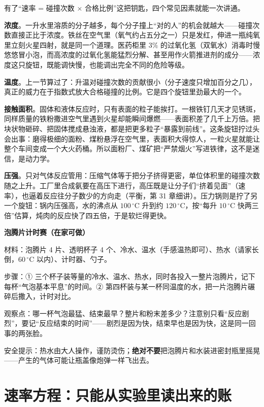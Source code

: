 有了“速率 = 碰撞次数 × 合格比例”这把钥匙，四个常见因素就能一次讲通。

\textbf{浓度}。一升水里溶质的分子越多，每个分子撞上“对的人”的机会就越大——碰撞次数直接正比于浓度。铁丝在空气里（氧气约占五分之一）只是发红，伸进一瓶纯氧里立刻火星四射，就是同一个道理。医药柜里 $3\%$ 的过氧化氢（双氧水）消毒时慢悠悠冒小泡，而高浓度的过氧化氢能猛烈分解、甚至用作火箭推进剂的成分——浓度这只旋钮，既能调快慢，也能调出完全不同的危险等级。

\textbf{温度}。上一节算过了：升温对碰撞次数的贡献很小（分子速度只增加百分之几），真正的威力在于指数式放大合格碰撞的比例。它是四个旋钮里劲最大的一个。

\textbf{接触面积}。固体和液体反应时，只有表面的粒子能挨打。一根铁钉几天才见锈斑，同样质量的铁粉撒进空气里遇到火星却能瞬间爆燃——表面积差了几千上万倍。把块状物砸碎、把固体搅成悬浊液，都是把更多粒子“暴露到前线”。这条旋钮拧过头会出事：磨得极细的面粉、煤粉悬浮在空气里，表面积大得惊人，一粒火星就能让整个车间变成一个大火药桶。所以面粉厂、煤矿把“严禁烟火”写进铁律，这不是迷信，是动力学。

\textbf{压强}。只对气体反应管用：压缩气体等于把分子挤得更密，单位体积里的碰撞次数随之上升。工厂里合成氨要在高压下进行，高压既是让分子们“挤着见面”（速率），也逼着反应往分子数少的方向走（平衡，第 31 章细讲）。压力锅则是拧了另一个旋钮：锅内压强高，水的沸点从 $100\,^{\circ}\mathrm{C}$ 升到约 $120\,^{\circ}\mathrm{C}$，按“每升 $10\,^{\circ}\mathrm{C}$ 快两三倍”估算，炖肉的反应快了四五倍，于是软烂得更快。

\begin{shiyan}
\textbf{泡腾片计时赛（在家可做）}

材料：泡腾片 4 片、透明杯子 4 个、冷水、温水（手感温热即可）、热水（请家长倒，$60\,^{\circ}\mathrm{C}$ 以内）、计时器、勺子。

步骤：① 三个杯子装等量的冷水、温水、热水，同时各投入一整片泡腾片，记下每杯“气泡基本平息”的时间。② 第四杯装与某一杯同温度的水，把一片泡腾片碾碎后撒入，计时对比。

观察点：哪一杯气泡最猛、结束最早？整片和粉末差多少？注意别只看“反应剧烈”，要记“反应结束的时间”——剧烈是因为快，结束早也是因为快，这是同一回事的两张脸。

安全提示：热水由大人操作，谨防烫伤；\textbf{绝对不要}把泡腾片和水装进密封瓶里摇晃——产生的气体可能让瓶盖像炮弹一样飞出去。
\end{shiyan}

\section{速率方程：只能从实验里读出来的账}

